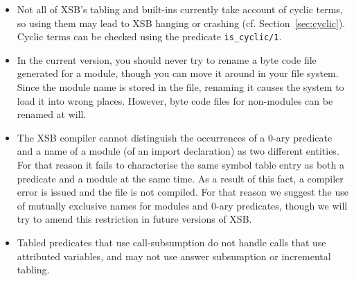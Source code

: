 \begin{itemize}
\item Not all of XSB's tabling and built-ins currently take account of
  cyclic terms, so using them may lead to XSB hanging or crashing
  (cf. Section~\ref{sec:cyclic}).  Cyclic terms can be checked using
  the predicate {\tt is\_cyclic/1}.
%
\item In the current version, you should never try to rename a byte code 
      file generated for a module, though you can move it around in your 
      file system.  Since the module name is stored in the file, renaming it
      causes the system to load it into wrong places.  However, byte code 
      files for non-modules can be renamed at will.
%
%
\item	The XSB compiler cannot distinguish the occurrences of a
      0-ary predicate and a name of a module (of an import declaration) as
      two different entities.  For that reason it fails to characterise the
      same symbol table entry as both a predicate and a module at the
      same time.  As a result of this fact, a compiler error is issued
      and the file is not compiled.  For that reason we suggest the
      use of mutually exclusive names for modules and 0-ary predicates,
      though we will try to amend this restriction in future versions of
      XSB.
%
\item Tabled predicates that use call-subsumption do not handle calls
  that use attributed variables, and may not use answer subsumption or
  incremental tabling.


\end{itemize}
